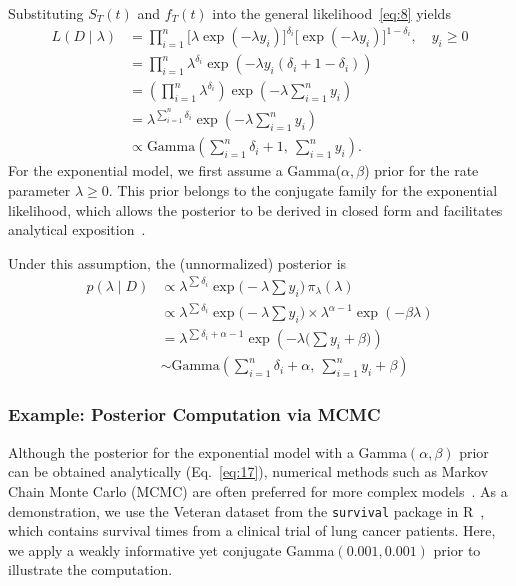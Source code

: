 Substituting $S_T(t)$ and $f_T(t)$ into the general likelihood~\eqref{eq:8} yields~\cite{ibrahim2013bayesian}
\begin{align}
L(D \mid \lambda)
&=\prod_{i=1}^{n}
\big[\lambda \exp(-\lambda y_i)\big]^{\delta_i}
\big[\exp(-\lambda y_i)\big]^{1-\delta_i}, \quad y_i \ge 0 \\
&=
\prod_{i=1}^{n}
\lambda^{\delta_i}
\exp\left(
-\lambda y_i (\delta_i + 1 - \delta_i)
\right) \\
&=
\left(
\prod_{i=1}^{n}
\lambda^{\delta_i}
\right)
\exp\left(
-\lambda \sum_{i=1}^{n} y_i
\right)\\
&=
\lambda^{\sum_{i=1}^{n} \delta_i}
\exp\left(
-\lambda \sum_{i=1}^{n} y_i
\right)\\
&\propto
\text{Gamma}
\left(
\sum_{i=1}^{n} \delta_i + 1,\ \sum_{i=1}^{n} y_i
\right).
\end{align}
For the exponential model, we first assume a Gamma($\alpha, \beta$) prior for the rate parameter $\lambda \ge 0$. This prior belongs to the conjugate family for the exponential likelihood, which allows the posterior to be derived in closed form and facilitates analytical exposition~\cite{kalbfleisch2002statistical}.

Under this assumption, the (unnormalized) posterior is
\begin{align}
p(\lambda\mid D)
\label{eq:16}
&\propto \lambda^{\sum \delta_i}
\exp\Big(-\lambda \sum y_i\Big)\, \pi_\lambda(\lambda)\,\\
&\propto
\lambda^{\sum \delta_i}
\exp\Big(-\lambda \sum y_i\Big)
\times
\lambda^{\alpha - 1}
\exp(-\beta \lambda)\\
&=\lambda^{\sum \delta_i + \alpha - 1}
\exp \left( - \lambda \big(\sum y_i + \beta\big) \right) \\
&\sim
\text{Gamma}
\left(
\sum_{i=1}^{n} \delta_i + \alpha,\ \sum_{i=1}^{n} y_i + \beta
\right)
\label{eq:17}
\end{align}

\subsubsection{Example: Posterior Computation via MCMC}
Although the posterior for the exponential model with a Gamma$(\alpha,\beta)$ prior can be obtained analytically (Eq.~\ref{eq:17}), numerical methods such as Markov Chain Monte Carlo (MCMC) are often preferred for more complex models~\cite{robert2007bayesian,ibrahim2013bayesian}. As a demonstration, we use the Veteran dataset from the \texttt{survival} package in R~\cite{survival-package}, which contains survival times from a clinical trial of lung cancer patients. Here, we apply a weakly informative yet conjugate Gamma$(0.001,0.001)$ prior to illustrate the computation.


